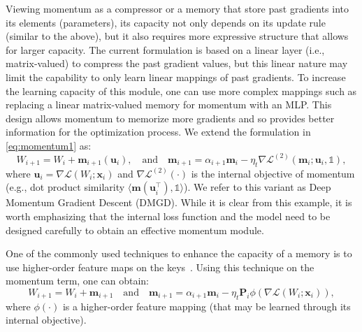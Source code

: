 \documentclass{article}
\newcommand{\citep}{\parencite}
\newcommand{\inner}[2]{\langle #1, #2 \rangle}
\newcommand{\head}[1]{\vspace{1.7mm}\noindent{{\textcolor{c4}{\bf #1.}}}}
\newcommand{\mb}[1]{\boldsymbol{#1}}
\newcommand{\vm}{\boldsymbol{m}}
\newcommand{\vp}{\boldsymbol{P}}
\begin{document}
\head{Extension: More Expressive Memory}
{Viewing momentum as a compressor or a memory that store past gradients into its elements (parameters), its capacity not only depends on its update rule (similar to the above), but it also requires more expressive structure that allows for larger capacity. The current formulation is based on a linear layer (i.e., matrix-valued) to compress the past gradient values, but this linear nature may limit the capability to only learn linear mappings of past gradients. To increase the learning capacity of this module, one can use more complex mappings  such as replacing a linear matrix-valued memory for momentum with an MLP. This design allows momentum to memorize more gradients and so provides better information for the optimization process. We extend the formulation in \autoref{eq:momentum1} as:
\begin{equation}\label{eq:deep-momentum}
    W_{i+1} = W_i + \mathbf{m}_{i+1}\left(\mb{u}_i\right), \quad \textrm{and}\quad 
    \mathbf{m}_{i+1} = \alpha_{i+1} \mathbf{m}_{i} - \eta_t \nabla \mathcal{L}^{(2)}(\vm_i; \mb{u}_i, \mathds{1}), 
\end{equation}
where $\mb{u}_i = \nabla \mathcal{L}\left(W_{i};\boldsymbol{x}_i\right)$ and $\nabla \mathcal{L}^{(2)}(\cdot)$ is the internal objective of momentum (e.g., dot product similarity $\inner{\vm(\mb{u}_i^{\top})}{\mathds{1}}$). We refer to this variant as Deep Momentum Gradient Descent {(DMGD)}. While it is clear from this example, it is worth emphasizing that the internal loss function and the model need to be designed carefully to obtain an effective momentum module. 

\head{Extension: Memory with Higher-order Feature Maps} One of the commonly used techniques to enhance the capacity of a memory is to use higher-order feature maps on the keys~\citep{polysketchformer-kacham2024, katharopoulos2020transformers}. Using this technique on the momentum term, one can obtain: 
\begin{equation}
    W_{i+1} = W_i + \mathbf{m}_{i+1}\quad \textrm{and}\quad
    \mathbf{m}_{i+1} = \alpha_{i+1} \mathbf{m}_{i} - \eta_t \vp_i  \phi(\nabla \mathcal{L}\left(W_{i};\boldsymbol{x}_i\right)), 
\end{equation}
where $\phi(\cdot)$ is a higher-order feature mapping (that may be learned through its internal objective). 

}
\end{document}
